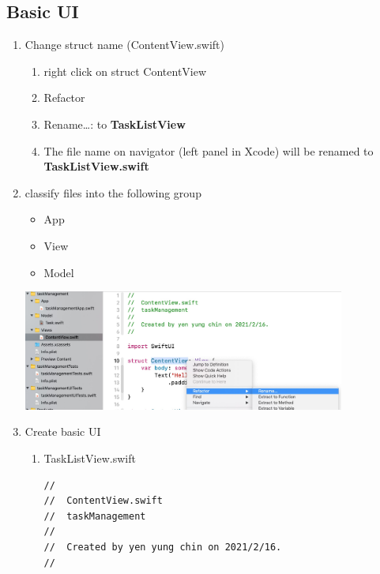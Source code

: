 \documentclass[a4paper,12pt]{article}
\begin{document}
\subsection{Basic UI}
\label{sec:org10d8b2c}
\begin{enumerate}
\item Change struct name (ContentView.swift)
\label{sec:org0f3a882}
\begin{enumerate}
\item right click on struct ContentView\\
\item Refactor\\
\item Rename\ldots{}: to \textbf{TaskListView}\\
\item The file name on navigator (left panel in Xcode) will be renamed to \textbf{TaskListView.swift}\\
\end{enumerate}
\item classify files into the following group
\label{sec:org959063e}
\begin{itemize}
\item App\\
\item View\\
\item Model\\
\end{itemize}
\begin{center}
\includegraphics[width=400]{images/renameStruct.jpg}
\label{fig:RenameStructName}
\end{center}
\item Create basic UI
\label{sec:org1ad7d2c}
\begin{enumerate}
\item TaskListView.swift
\label{sec:org78e3b4a}
\lstset{breaklines=true,language=swift,label= ,caption= ,captionpos=b,firstnumber=1,numbers=left}
\begin{lstlisting}
//
//  ContentView.swift
//  taskManagement
//
//  Created by yen yung chin on 2021/2/16.
//


\end{lstlisting}
\end{enumerate}
\end{enumerate}
\end{document}
